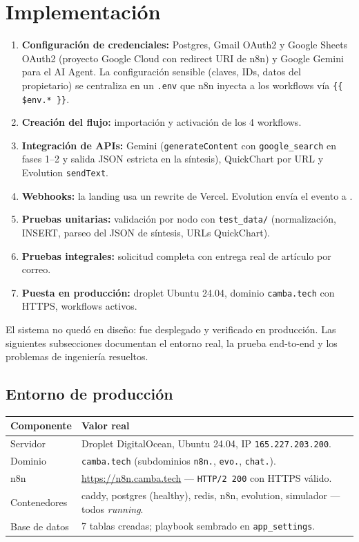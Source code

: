 \documentclass[11pt,a4paper]{article}
\newcommand{\code}[1]{\texttt{\small #1}}
\begin{document}
\section{Implementación}
\label{sec:deploy}
\begin{enumerate}[leftmargin=1.6em]
\item \textbf{Configuración de credenciales:} Postgres, Gmail OAuth2 y Google Sheets OAuth2 (proyecto Google Cloud con redirect URI de n8n) y Google Gemini para el AI Agent. La configuración sensible (claves, IDs, datos del propietario) se centraliza en un \code{.env} que n8n inyecta a los workflows vía \code{\{\{ \$env.* \}\}}.
\item \textbf{Creación del flujo:} importación y activación de los 4 workflows.
\item \textbf{Integración de APIs:} Gemini (\code{generateContent} con \code{google\_search} en fases 1--2 y salida JSON estricta en la síntesis), QuickChart por URL y Evolution \code{sendText}.
\item \textbf{Webhooks:} la landing usa un rewrite de Vercel. Evolution envía el evento  a .
\item \textbf{Pruebas unitarias:} validación por nodo con \code{test\_data/} (normalización, INSERT, parseo del JSON de síntesis, URLs QuickChart).
\item \textbf{Pruebas integrales:} solicitud completa con entrega real de artículo por correo.
\item \textbf{Puesta en producción:} droplet Ubuntu 24.04, dominio \code{camba.tech} con HTTPS, workflows activos.
\end{enumerate}

\medskip
El sistema no quedó en diseño: fue desplegado y verificado en producción. Las siguientes subsecciones documentan el entorno real, la prueba end-to-end y los problemas de ingeniería resueltos.

\subsection{Entorno de producción}
\renewcommand{\arraystretch}{1.2}
\begin{longtable}{L{4.4cm} L{10.6cm}}
\toprule \textbf{Componente} & \textbf{Valor real}\\ \midrule \endhead
Servidor & Droplet DigitalOcean, Ubuntu 24.04, IP \code{165.227.203.200}.\\
Dominio & \code{camba.tech} (subdominios \code{n8n.}, \code{evo.}, \code{chat.}).\\
n8n & \url{https://n8n.camba.tech} --- \code{HTTP/2 200} con HTTPS válido.\\
Contenedores & caddy, postgres (healthy), redis, n8n, evolution, simulador --- todos \emph{running}.\\
Base de datos & 7 tablas creadas; playbook sembrado en \code{app\_settings}.\\
\bottomrule
\end{longtable}
\end{document}
